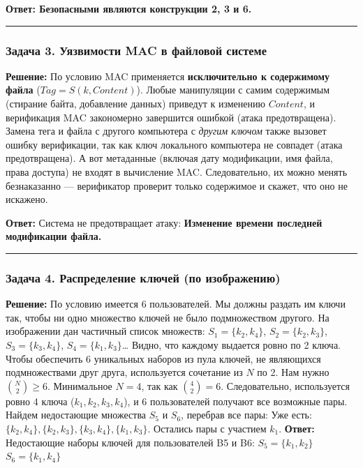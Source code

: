 \textbf{Ответ: Безопасными являются конструкции 2, 3 и 6.}

\begin{center}\rule{0.5\linewidth}{0.5pt}\end{center}

\subsubsection{Задача 3. Уязвимости MAC в файловой системе}\label{ux437ux430ux434ux430ux447ux430-3.-ux443ux44fux437ux432ux438ux43cux43eux441ux442ux438-mac-ux432-ux444ux430ux439ux43bux43eux432ux43eux439-ux441ux438ux441ux442ux435ux43cux435}

\textbf{Решение:} По условию MAC применяется \textbf{исключительно к содержимому файла} (\(Tag = S(k, Content)\)). Любые манипуляции с самим содержимым (стирание байта, добавление данных) приведут к изменению \(Content\), и верификация MAC закономерно завершится ошибкой (атака предотвращена). Замена тега и файла с другого компьютера с \emph{другим ключом} также вызовет ошибку верификации, так как ключ локального компьютера не совпадет (атака предотвращена). А вот метаданные (включая дату модификации, имя файла, права доступа) не входят в вычисление MAC. Следовательно, их можно менять безнаказанно --- верификатор проверит только содержимое и скажет, что оно не искажено.

\textbf{Ответ:} Система не предотвращает атаку: \textbf{Изменение времени последней модификации файла.}

\begin{center}\rule{0.5\linewidth}{0.5pt}\end{center}

\subsubsection{Задача 4. Распределение ключей (по изображению)}\label{ux437ux430ux434ux430ux447ux430-4.-ux440ux430ux441ux43fux440ux435ux434ux435ux43bux435ux43dux438ux435-ux43aux43bux44eux447ux435ux439-ux43fux43e-ux438ux437ux43eux431ux440ux430ux436ux435ux43dux438ux44e}

\textbf{Решение:} По условию имеется 6 пользователей. Мы должны раздать им ключи так, чтобы ни одно множество ключей не было подмножеством другого. На изображении дан частичный список множеств: \(S_1 = \{k_2, k_4\}\), \(S_2 = \{k_2, k_3\}\), \(S_3 = \{k_3, k_4\}\), \(S_4 = \{k_1, k_3\}\)\ldots{} Видно, что каждому выдается ровно по 2 ключа. Чтобы обеспечить 6 уникальных наборов из пула ключей, не являющихся подмножествами друг друга, используется сочетание из \(N\) по 2. Нам нужно \(\binom{N}{2} \ge 6\). Минимальное \(N=4\), так как \(\binom{4}{2} = 6\). Следовательно, используется ровно 4 ключа (\(k_1, k_2, k_3, k_4\)), и 6 пользователей получают все возможные пары. Найдем недостающие множества \(S_5\) и \(S_6\), перебрав все пары: Уже есть: \(\{k_2, k_4\}, \{k_2, k_3\}, \{k_3, k_4\}, \{k_1, k_3\}\). Остались пары с участием \(k_1\). \textbf{Ответ:} Недостающие наборы ключей для пользователей B5 и B6: \textbf{\(S_5 = \{k_1, k_2\}\)} \textbf{\(S_6 = \{k_1, k_4\}\)}

